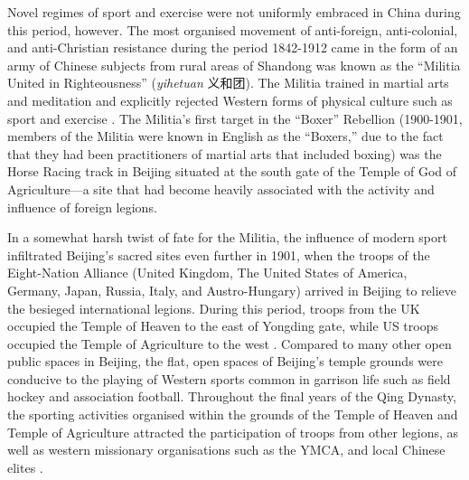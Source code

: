{%
Novel regimes of sport and exercise were not uniformly embraced in China during this period, however.  The most organised movement of anti-foreign, anti-colonial, and anti-Christian resistance during the period 1842-1912 came in the form of an army of Chinese subjects from rural areas of Shandong was known as the ``Militia United in Righteousness'' (\textit{yihetuan} 义和团).  The Militia trained in martial arts and meditation and explicitly rejected Western forms of physical culture such as sport and exercise \citep{Brownell2008}.  The Militia's first target in the ``Boxer'' Rebellion (1900-1901, members of the Militia were known in English as the ``Boxers,'' due to the fact that they had been practitioners of martial arts that included boxing) was the Horse Racing track in Beijing situated at the south gate of the Temple of God of Agriculture---a site that had become heavily associated with the activity and influence of foreign legions.

In a somewhat harsh twist of fate for the Militia, the influence of modern sport infiltrated Beijing's sacred sites even further in 1901, when the troops of the Eight-Nation Alliance (United Kingdom, The United States of America, Germany, Japan, Russia, Italy, and Austro-Hungary) arrived in Beijing to relieve the besieged international legions.  During this period, troops from the UK occupied the Temple of Heaven to the east of Yongding gate, while US troops occupied the Temple of Agriculture to the west \citep{Brownell2008}. Compared to many other open public spaces in Beijing, the flat, open spaces of Beijing's temple grounds were conducive to the playing of Western sports common in garrison life such as field hockey and association football.  Throughout the final years of the Qing Dynasty, the sporting activities organised within the grounds of the Temple of Heaven and Temple of Agriculture attracted the participation of troops from other legions, as well as western missionary organisations such as the YMCA, and local Chinese elites \citep{Steel1985}.


}
